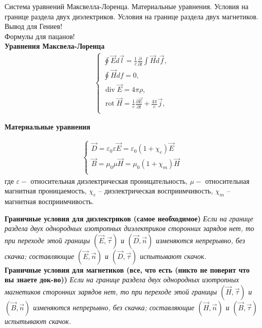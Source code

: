 \documentclass[__main__.tex]{subfiles}
\begin{document}
Система уравнений Максвелла-Лоренца. Материальные уравнения. Условия на границе раздела двух диэлектриков. Условия на границе раздела двух магнетиков.\\

Вывод для Гениев!\\
Формулы для пацанов!\\

\textbf{Уравнения Максвела-Лоренца}
\begin{gather*}
    \begin{cases}
        \oint\vec{E}d\vec{l}
        =
        \frac{1}{c}\frac{\partial}{\partial t}\int\vec{H}d\vec{f},           \\
        \oint\vec{H}df
        =
        0,                                                                   \\
        \operatorname{div}\vec{E}
        =
        4\pi\rho,                                                            \\
        \operatorname{rot}\vec{H}=
        \frac{1}{c}\frac{\partial\vec{E}}{\partial t}+\frac{4\pi}{c}\vec{j}, \\
    \end{cases}
\end{gather*}

\textbf{Материальные уравнения}

\begin{gather*}
    \begin{cases}
        \vec{D}=\varepsilon_{0}\varepsilon\vec{E}=\varepsilon_{0}(1+\chi_{e})\vec{E} \\
        \vec{B}=\mu_{0}\mu\vec{H}=\mu_{0}(1+\chi _{m})\vec{H}                        \\
    \end{cases}
\end{gather*}
где $\varepsilon-$ относительная диэлектрическая проницательность, $\mu-$ относительная магнитная проницаемость, $\chi_{e}$ -- диэлектрическая восприимчивость, $\chi _{m}$ -- магнитная восприимчивость.

\textbf{Граничные условия для диэлектриков (самое необходимое)} \emph{Если на границе раздела двух однородных изотропных диэлектриков сторонних зарядов нет, то при переходе этой границы $(\vec{E},\vec{\tau})$ и $(\vec{D},\vec{n})$ изменяются непрерывно, без скачка; составляющие $(\vec{E},\vec{n})$ и $(\vec{D},\vec{\tau})$ испытывают скачок.}\\

\textbf{Граничные условия для магнетиков (все, что есть (никто не поверит что вы знаете док-во))} \emph{Если на границе раздела двух однородных изотропных магнетиков сторонних зарядов нет, то при переходе этой границы $(\vec{H},\vec{\tau})$ и $(\vec{B},\vec{n})$ изменяются непрерывно, без скачка; составляющие $(\vec{H},\vec{n})$ и $(\vec{B},\vec{\tau})$ испытывают скачок.}\\
\end{document}
